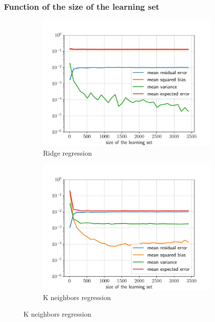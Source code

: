 \subsubsection*{Function of the size of the learning set}
\begin{figure}[H]
    \centering
    \begin{subfigure}{0.495\textwidth}
        \includegraphics[width=\textwidth]{resources/pdf/Q3e_Ridge_size_ls.pdf}
        \caption{Ridge regression}
    \end{subfigure}
    \begin{subfigure}{0.495\textwidth}
        \includegraphics[width=\textwidth]{resources/pdf/Q3e_KNeighborsRegressor_size_ls.pdf}
        \caption{K neighbors regression}
    \end{subfigure}
\end{figure}
